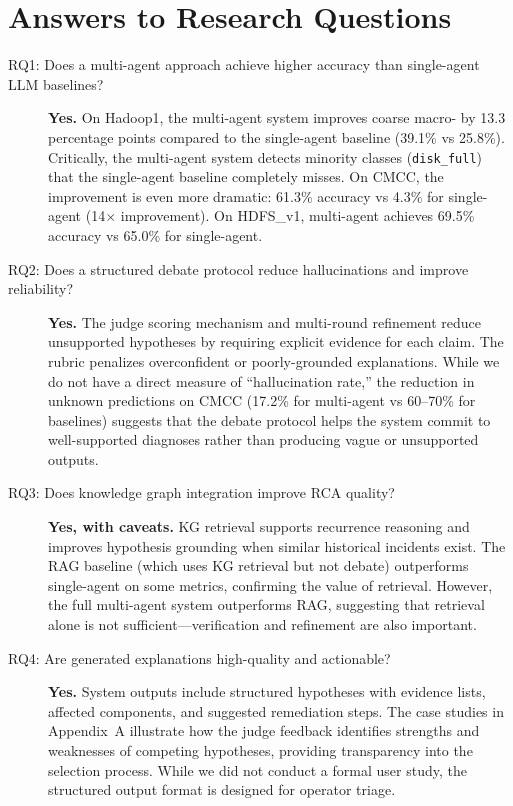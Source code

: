 \section{Answers to Research Questions}

\begin{description}
  \item[RQ1: Does a multi-agent approach achieve higher accuracy than single-agent LLM
        baselines?]
  \textbf{Yes.} On Hadoop1, the multi-agent system improves coarse macro-\fone{} by 13.3
  percentage points compared to the single-agent baseline (39.1\% vs 25.8\%). Critically, the
  multi-agent system detects minority classes (\texttt{disk\_full}) that the single-agent baseline
  completely misses. On CMCC, the improvement is even more dramatic: 61.3\% accuracy vs 4.3\% for
  single-agent (14$\times$ improvement). On HDFS\_v1, multi-agent achieves 69.5\% accuracy vs
  65.0\% for single-agent.

  \item[RQ2: Does a structured debate protocol reduce hallucinations and improve reliability?]
  \textbf{Yes.} The judge scoring mechanism and multi-round refinement reduce unsupported
  hypotheses by requiring explicit evidence for each claim. The rubric penalizes overconfident or
  poorly-grounded explanations. While we do not have a direct measure of ``hallucination rate,''
  the reduction in unknown predictions on CMCC (17.2\% for multi-agent vs 60--70\% for baselines)
  suggests that the debate protocol helps the system commit to well-supported diagnoses rather
  than producing vague or unsupported outputs.

  \item[RQ3: Does knowledge graph integration improve RCA quality?]
  \textbf{Yes, with caveats.} KG retrieval supports recurrence reasoning and improves hypothesis
  grounding when similar historical incidents exist. The RAG baseline (which uses KG retrieval but
  not debate) outperforms single-agent on some metrics, confirming the value of retrieval.
  However, the full multi-agent system outperforms RAG, suggesting that retrieval alone is not
  sufficient---verification and refinement are also important.

  \item[RQ4: Are generated explanations high-quality and actionable?]
  \textbf{Yes.} System outputs include structured hypotheses with evidence lists, affected
  components, and suggested remediation steps. The case studies in Appendix~A illustrate how the
  judge feedback identifies strengths and weaknesses of competing hypotheses, providing
  transparency into the selection process. While we did not conduct a formal user study, the
  structured output format is designed for operator triage.
\end{description}

